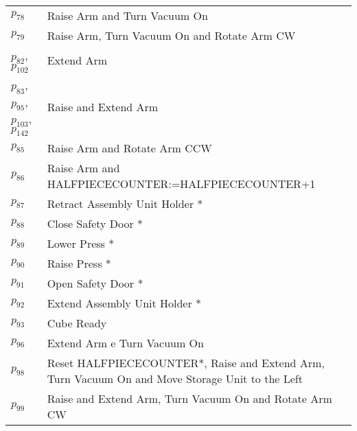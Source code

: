 \begin{longtable}{M{5cm}M{10cm}}
\hyperlink{completeNet:p78}{\hypertarget{completeTable:p78}{$p_{78}$}} & Raise Arm and Turn Vacuum On\\
\hyperlink{completeNet:p79}{\hypertarget{completeTable:p79}{$p_{79}$}} & Raise Arm, Turn Vacuum On and Rotate Arm CW\\
\hyperlink{completeNet:p82}{\hypertarget{completeTable:p82}{$p_{82}$}}, \hyperlink{completeNet:p102}{\hypertarget{completeTable:p102}{$p_{102}$}} & Extend Arm\\
\hyperlink{completeNet:p83}{\hypertarget{completeTable:p83}{$p_{83}$}}, \hyperlink{completeNet:p95}{\hypertarget{completeTable:p95}{$p_{95}$}}, \hyperlink{completeNet:p103}{\hypertarget{completeTable:p103}{$p_{103}$}}, \hyperlink{completeNet:p142}{\hypertarget{completeTable:p142}{$p_{142}$}} & Raise and Extend Arm\\
\hyperlink{completeNet:p85}{\hypertarget{completeTable:p85}{$p_{85}$}} & Raise Arm and Rotate Arm CCW\\
\hyperlink{completeNet:p86}{\hypertarget{completeTable:p86}{$p_{86}$}} & Raise Arm and HALFPIECECOUNTER:=HALFPIECECOUNTER+1\\
\hyperlink{completeNet:p87}{\hypertarget{completeTable:p87}{$p_{87}$}} & Retract Assembly Unit Holder *\\
\hyperlink{completeNet:p88}{\hypertarget{completeTable:p88}{$p_{88}$}} & Close Safety Door *\\
\hyperlink{completeNet:p89}{\hypertarget{completeTable:p89}{$p_{89}$}} & Lower Press *\\
\hyperlink{completeNet:p90}{\hypertarget{completeTable:p90}{$p_{90}$}} & Raise Press *\\
\hyperlink{completeNet:p91}{\hypertarget{completeTable:p91}{$p_{91}$}} & Open Safety Door *\\
\hyperlink{completeNet:p92}{\hypertarget{completeTable:p92}{$p_{92}$}} & Extend Assembly Unit Holder *\\
\hyperlink{completeNet:p93}{\hypertarget{completeTable:p93}{$p_{93}$}} & Cube Ready\\
\hyperlink{completeNet:p96}{\hypertarget{completeTable:p96}{$p_{96}$}} & Extend Arm e Turn Vacuum On\\
\hyperlink{completeNet:p98}{\hypertarget{completeTable:p98}{$p_{98}$}} & Reset HALFPIECECOUNTER*, Raise and Extend Arm, Turn Vacuum On and Move Storage Unit to the Left\\
\hyperlink{completeNet:p99}{\hypertarget{completeTable:p99}{$p_{99}$}} & Raise and Extend Arm, Turn Vacuum On and Rotate Arm CW\\

\end{longtable}

